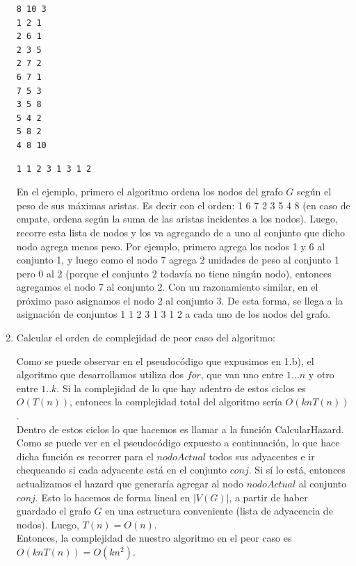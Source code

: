 \documentclass[11pt, a4paper, twoside]{article}
\begin{document}
\begin{enumerate}
\begin{minipage}[t]{0.4\textwidth}
\begin{Verbatim}[frame=single,framesep=1cm,label= Ejemplo de entrada: instancia 1]
8 10 3
1 2 1
2 6 1
2 3 5
2 7 2
6 7 1
7 5 3
3 5 8
5 4 2
5 8 2
4 8 10
\end{Verbatim}
\end{minipage}
\hfill
\begin{minipage}[t]{0.4\textwidth}
\begin{Verbatim}[frame=single,framesep=1cm,label= Ejemplo de salida: instancia 1]
1 1 2 3 1 3 1 2
\end{Verbatim}
\end{minipage}
		
		En el ejemplo, primero el algoritmo ordena los nodos del grafo $G$ según el peso de sus máximas
		aristas. Es decir con el orden: 1 6 7 2 3 5 4 8 (en caso de empate, ordena según la suma de las aristas
		incidentes a los nodos). Luego, recorre esta lista de nodos y los va agregando de a uno al conjunto que
		dicho nodo agrega menos peso. Por ejemplo, primero agrega los nodos 1 y 6 al conjunto 1, y luego como el
		nodo 7 agrega 2 unidades de peso al conjunto 1 pero 0 al 2 (porque el conjunto 2 todavía no tiene ningún
		nodo), entonces agregamos el nodo 7 al conjunto 2. Con un razonamiento similar, en el próximo paso asignamos
		el nodo 2 al conjunto 3. De esta forma, se llega a la asignación de conjuntos 1 1 2 3 1 3 1 2 a cada uno de
		los nodos del grafo.
		
		\item Calcular el orden de complejidad de peor caso del algoritmo:
		
		Como se puede observar en el pseudocódigo que expusimos en 1.b), el algoritmo que desarrollamos utiliza dos $for$, 
		que van uno entre $1 \dots n$ y otro entre $1..k$.
		Si la complejidad de lo que hay adentro de estos ciclos es $O(T(n))$, entonces la complejidad total
		del algoritmo sería $O(knT(n))$. \\
		Dentro de estos ciclos lo que hacemos es llamar a la función CalcularHazard. Como se puede ver en el pseudocódigo
		expuesto a continuación, lo que hace dicha función es
		recorrer para el $nodoActual$ todos sus adyacentes e ir chequeando si cada adyacente está en el conjunto $conj$. 
		Si sí lo está, entonces actualizamos el hazard que generaría agregar al nodo $nodoActual$ al conjunto $conj$. 
		Esto lo hacemos de forma lineal 
		en $|V(G)|$, a partir de haber guardado el grafo $G$ en una estructura conveniente (lista de adyacencia 
		de nodos). Luego, $T(n) = O(n)$. \\
		Entonces, la complejidad de nuestro algoritmo en el peor caso es $ O(knT(n)) = O(k n^2)$.
		

\end{enumerate}
\end{document}
